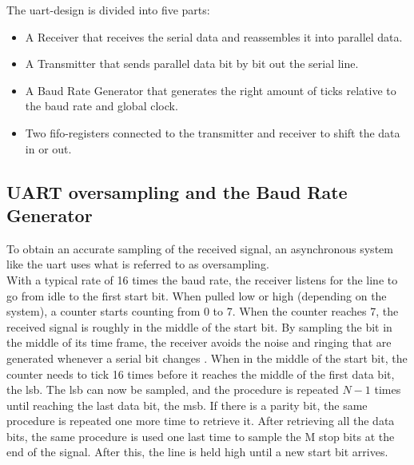 \documentclass[main.tex]{subfiles}
\begin{document}
The \gls{uart}-design is divided into five parts:
\begin{itemize}
\item A Receiver that receives the serial data and reassembles it into parallel data.
\item A Transmitter that sends parallel data bit by bit out the serial line.
\item A Baud Rate Generator that generates the right amount of ticks relative to the baud rate and global clock.
\item Two \gls{fifo}-registers connected to the transmitter and receiver to shift the data in or out.
\end{itemize}

\subsection{UART oversampling and the Baud Rate Generator}

To obtain an accurate sampling of the received signal, an asynchronous system like the \gls{uart} uses what is referred to as oversampling. \\

With a typical rate of 16 times the baud rate, the receiver listens for the line to go from idle to the first start bit. When pulled low or high (depending on the system), a counter starts counting from 0 to 7. When the counter reaches 7, the received signal is roughly in the middle of the start bit. By sampling the bit in the middle of its time frame, the receiver avoids the noise and ringing that are generated whenever a serial bit changes \cite{rapid08}. When in the middle of the start bit, the counter needs to tick 16 times before it reaches the middle of the first data bit, the \gls{lsb}. The \gls{lsb} can now be sampled, and the procedure is repeated $N - 1$ times until reaching the last data bit, the \acrshort{msb}. If there is a parity bit, the same procedure is repeated one more time to retrieve it. After retrieving all the data bits, the same procedure is used one last time to sample the M stop bits at the end of the signal. After this, the line is held high until a new start bit arrives. 

\end{document}
